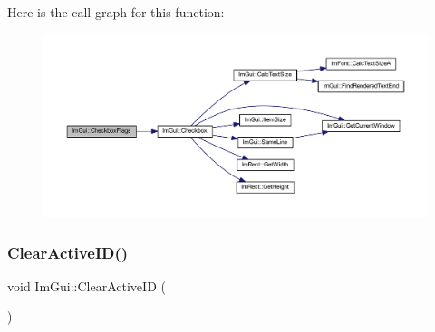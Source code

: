 Here is the call graph for this function\+:
\nopagebreak
\begin{figure}[H]
\begin{center}
\leavevmode
\includegraphics[width=350pt]{namespace_im_gui_aeca400dcf5a82c312b3e669d2fe6e88d_cgraph}
\end{center}
\end{figure}
\mbox{\label{namespace_im_gui_a17ff60ad1e2669130ac38a04d16eb354}} 
\subsubsection{\texorpdfstring{Clear\+Active\+I\+D()}{ClearActiveID()}}
{\footnotesize\ttfamily void Im\+Gui\+::\+Clear\+Active\+ID (\begin{DoxyParamCaption}{ }\end{DoxyParamCaption})}

